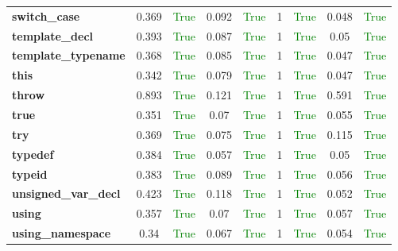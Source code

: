\documentclass{article}
\begin{document}
\begin{xltabular}{\textwidth}{lcccccccc}
\textbf{{\fontsize{10}{12}\selectfont switch\_case}}& 0.369&\textcolor{green}{True}& 0.092&\textcolor{green}{True}& 1&\textcolor{green}{True}& 0.048&\textcolor{green}{True} \\[0.5ex]
\textbf{{\fontsize{10}{12}\selectfont template\_decl}}& 0.393&\textcolor{green}{True}& 0.087&\textcolor{green}{True}& 1&\textcolor{green}{True}& 0.05&\textcolor{green}{True} \\[0.5ex]
\textbf{{\fontsize{10}{12}\selectfont template\_typename}}& 0.368&\textcolor{green}{True}& 0.085&\textcolor{green}{True}& 1&\textcolor{green}{True}& 0.047&\textcolor{green}{True} \\[0.5ex]
\textbf{{\fontsize{10}{12}\selectfont this}}& 0.342&\textcolor{green}{True}& 0.079&\textcolor{green}{True}& 1&\textcolor{green}{True}& 0.047&\textcolor{green}{True} \\[0.5ex]
\textbf{{\fontsize{10}{12}\selectfont throw}}& 0.893&\textcolor{green}{True}& 0.121&\textcolor{green}{True}& 1&\textcolor{green}{True}& 0.591&\textcolor{green}{True} \\[0.5ex]
\textbf{{\fontsize{10}{12}\selectfont true}}& 0.351&\textcolor{green}{True}& 0.07&\textcolor{green}{True}& 1&\textcolor{green}{True}& 0.055&\textcolor{green}{True} \\[0.5ex]
\textbf{{\fontsize{10}{12}\selectfont try}}& 0.369&\textcolor{green}{True}& 0.075&\textcolor{green}{True}& 1&\textcolor{green}{True}& 0.115&\textcolor{green}{True} \\[0.5ex]
\textbf{{\fontsize{10}{12}\selectfont typedef}}& 0.384&\textcolor{green}{True}& 0.057&\textcolor{green}{True}& 1&\textcolor{green}{True}& 0.05&\textcolor{green}{True} \\[0.5ex]
\textbf{{\fontsize{10}{12}\selectfont typeid}}& 0.383&\textcolor{green}{True}& 0.089&\textcolor{green}{True}& 1&\textcolor{green}{True}& 0.056&\textcolor{green}{True} \\[0.5ex]
\textbf{{\fontsize{10}{12}\selectfont unsigned\_var\_decl}}& 0.423&\textcolor{green}{True}& 0.118&\textcolor{green}{True}& 1&\textcolor{green}{True}& 0.052&\textcolor{green}{True} \\[0.5ex]
\textbf{{\fontsize{10}{12}\selectfont using}}& 0.357&\textcolor{green}{True}& 0.07&\textcolor{green}{True}& 1&\textcolor{green}{True}& 0.057&\textcolor{green}{True} \\[0.5ex]
\textbf{{\fontsize{10}{12}\selectfont using\_namespace}}& 0.34&\textcolor{green}{True}& 0.067&\textcolor{green}{True}& 1&\textcolor{green}{True}& 0.054&\textcolor{green}{True} \\[0.5ex]

\end{xltabular}
\end{document}
